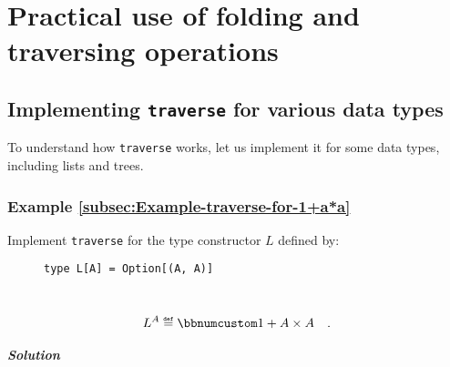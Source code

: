 \section{Practical use of folding and traversing operations}

\subsection{Implementing \texttt{traverse} for various data types}

To understand how \lstinline!traverse! works, let us implement it
for some data types, including lists and trees.

\subsubsection{Example \label{subsec:Example-traverse-for-1+a*a}\ref{subsec:Example-traverse-for-1+a*a}}

Implement \lstinline!traverse! for the type constructor $L$ defined
by:

\begin{wrapfigure}{l}{0.5\columnwidth}%
\vspace{-1\baselineskip}
\begin{lstlisting}
type L[A] = Option[(A, A)]
\end{lstlisting}
\vspace{-0.5\baselineskip}
\end{wrapfigure}%

~\vspace{-0.5\baselineskip}
\[
L^{A}\triangleq\bbnum 1+A\times A\quad.
\]


\subparagraph{Solution}

